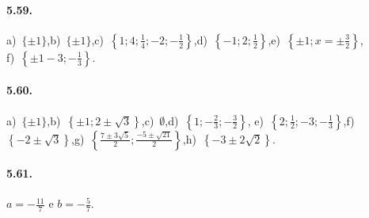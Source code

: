 \paragraph{5.59.} a)~$\{\pm 1\}$,\quad b)~$\{\pm 1\}$,\quad c)~$\left\{1;4;\frac 1 4;-2;-\frac 1 2\right\}$,\quad d)~$\left\{-1;2;\frac 1 2\right\}$,\quad e)~$\left\{\pm 1;x=\pm\frac 3 2\right\}$,\protect\\ \quad f)~$\left\{\pm 1-3;-\frac 1 3\right\}$.

\paragraph{5.60.} a)~$\{\pm 1\}$,\quad b)~$\left\{\pm 1;2\pm \sqrt 3\right\}$,\quad c)~$\emptyset$,\quad d)~$\left\{1; -\frac 2 3; -\frac{3}{2}\right\}$,\quad
 e)~$\left\{2;\frac 1 2;-3;-\frac 1 3\right\}$,\quad f)~$\left\{-2\pm \sqrt 3\right\}$,\quad g)~$\left\{\frac{7\pm 3\sqrt 5} 2;\frac{-5\pm \sqrt{21}} 2\right\}$,\quad h)~$\left\{-3\pm 2\sqrt 2\right\}$.

\paragraph{5.61.} $a=-\frac{11} 7$ e $b=-\frac 5 7$.